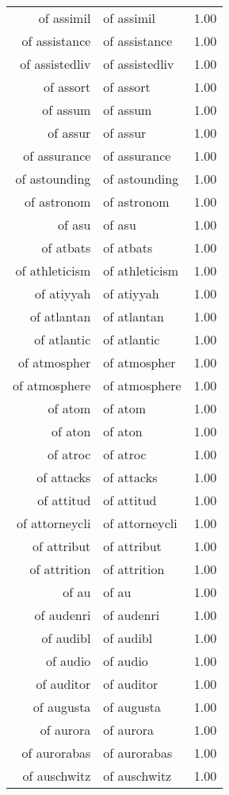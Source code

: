\begin{table}[ht]
\begin{tabular}{rlr}
  of assimil & of assimil & 1.00 \\ 
  of assistance & of assistance & 1.00 \\ 
  of assistedliv & of assistedliv & 1.00 \\ 
  of assort & of assort & 1.00 \\ 
  of assum & of assum & 1.00 \\ 
  of assur & of assur & 1.00 \\ 
  of assurance & of assurance & 1.00 \\ 
  of astounding & of astounding & 1.00 \\ 
  of astronom & of astronom & 1.00 \\ 
  of asu & of asu & 1.00 \\ 
  of atbats & of atbats & 1.00 \\ 
  of athleticism & of athleticism & 1.00 \\ 
  of atiyyah & of atiyyah & 1.00 \\ 
  of atlantan & of atlantan & 1.00 \\ 
  of atlantic & of atlantic & 1.00 \\ 
  of atmospher & of atmospher & 1.00 \\ 
  of atmosphere & of atmosphere & 1.00 \\ 
  of atom & of atom & 1.00 \\ 
  of aton & of aton & 1.00 \\ 
  of atroc & of atroc & 1.00 \\ 
  of attacks & of attacks & 1.00 \\ 
  of attitud & of attitud & 1.00 \\ 
  of attorneycli & of attorneycli & 1.00 \\ 
  of attribut & of attribut & 1.00 \\ 
  of attrition & of attrition & 1.00 \\ 
  of au & of au & 1.00 \\ 
  of audenri & of audenri & 1.00 \\ 
  of audibl & of audibl & 1.00 \\ 
  of audio & of audio & 1.00 \\ 
  of auditor & of auditor & 1.00 \\ 
  of augusta & of augusta & 1.00 \\ 
  of aurora & of aurora & 1.00 \\ 
  of aurorabas & of aurorabas & 1.00 \\ 
  of auschwitz & of auschwitz & 1.00 \\ 

\end{tabular}
\end{table}
